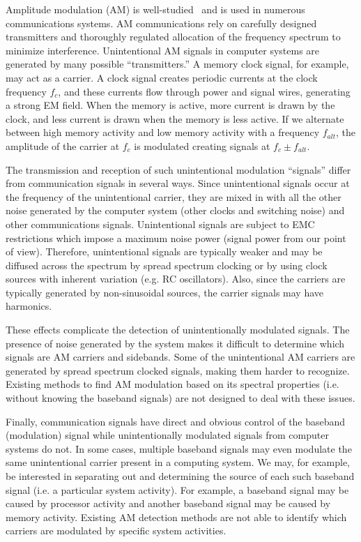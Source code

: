 Amplitude modulation (AM) is well-studied~\cite{rappaport} and is used in numerous communications systems. AM communications rely on carefully designed transmitters and thoroughly regulated allocation of the frequency spectrum to minimize interference. Unintentional AM signals in computer systems are generated by many possible ``transmitters.'' A memory clock signal, for example, may act as a carrier. A clock signal creates periodic currents at the clock frequency $f_c$, and these currents flow through power and signal wires, generating a strong EM field. When the memory is active, more current is drawn by the clock, and less current is drawn when the memory is less active. If we alternate between high memory activity and low memory activity with a frequency $f_{alt}$, the amplitude of the carrier at $f_c$ is modulated creating signals at $f_c \pm f_{alt}$.

The transmission and reception of such unintentional modulation ``signals'' differ from communication signals in several ways. Since unintentional signals occur at the frequency of the unintentional carrier, they are mixed in with all the other noise generated by the computer system (other clocks and switching noise) and other communications signals. Unintentional signals are subject to EMC restrictions which impose a maximum noise power (signal power from our point of view). Therefore, unintentional signals are typically weaker and may be diffused across the spectrum by spread spectrum clocking or by using clock sources with inherent variation (e.g. RC oscillators). Also, since the carriers are typically generated by non-sinusoidal sources, the carrier signals may have harmonics.

These effects complicate the detection of unintentionally modulated signals. The presence of noise generated by the system makes it difficult to determine which signals are AM carriers and sidebands. Some of the unintentional AM carriers are generated by spread spectrum clocked signals, making them harder to recognize. Existing methods to find AM modulation based on its spectral properties (i.e. without knowing the baseband signals) are not designed to deal with these issues.

Finally, communication signals have direct and obvious control of the baseband (modulation) signal while unintentionally modulated signals from computer systems do not. In some cases, multiple baseband signals may even modulate the same unintentional carrier present in a computing system. We may, for example, be interested in separating out and determining the source of each such baseband signal (i.e. a particular system activity). For example, a baseband signal may be caused by processor activity and another baseband signal may be caused by memory activity. Existing AM detection methods are not able to identify which carriers are modulated by specific system activities.

